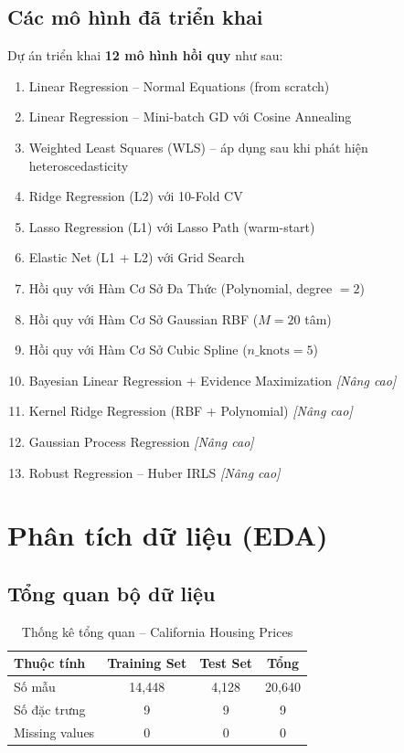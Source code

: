 \documentclass[12pt, a4paper]{article}
\begin{document}
\subsection{Các mô hình đã triển khai}
Dự án triển khai \textbf{12 mô hình hồi quy} như sau:
\begin{enumerate}
  \item Linear Regression -- Normal Equations (from scratch)
  \item Linear Regression -- Mini-batch GD với Cosine Annealing
  \item Weighted Least Squares (WLS) -- áp dụng sau khi phát hiện heteroscedasticity
  \item Ridge Regression (L2) với 10-Fold CV
  \item Lasso Regression (L1) với Lasso Path (warm-start)
  \item Elastic Net (L1 + L2) với Grid Search
  \item Hồi quy với Hàm Cơ Sở Đa Thức (Polynomial, degree $= 2$)
  \item Hồi quy với Hàm Cơ Sở Gaussian RBF ($M = 20$ tâm)
  \item Hồi quy với Hàm Cơ Sở Cubic Spline ($n\_\text{knots} = 5$)
  \item Bayesian Linear Regression + Evidence Maximization \textit{[Nâng cao]}
  \item Kernel Ridge Regression (RBF + Polynomial) \textit{[Nâng cao]}
  \item Gaussian Process Regression \textit{[Nâng cao]}
  \item Robust Regression -- Huber IRLS \textit{[Nâng cao]}
\end{enumerate}

\section{Phân tích dữ liệu (EDA)}
\label{sec:eda}

\subsection{Tổng quan bộ dữ liệu}

\begin{table}[H]
  \centering
  \caption{Thống kê tổng quan -- California Housing Prices}
  \label{tab:dataset_overview}
  \begin{tabular}{lccc}
    \toprule
    \textbf{Thuộc tính} & \textbf{Training Set} & \textbf{Test Set} & \textbf{Tổng} \\
    \midrule
    Số mẫu         & 14,448 & 4,128 & 20,640 \\
    Số đặc trưng   & 9      & 9     & 9      \\
    Missing values & 0      & 0     & 0      \\
    \bottomrule
  \end{tabular}
\end{table}
\end{document}
